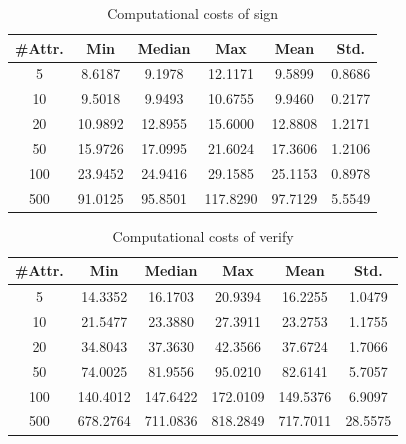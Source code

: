 \documentclass[9pt,conference]{IEEEtran}
\begin{document}
\begin{table}
\centering
\caption{Computational costs of sign}
\label{sign}
\begin{tabular}{cccccc}
\textbf{\#Attr.} & \textbf{Min} & \textbf{Median} & \textbf{Max} & \textbf{Mean} & \textbf{Std.} \\ \hline
5                & 8.6187             &9.1978                 & 12.1171             & 9.5899              &   0.8686            \\
10               & 9.5018             & 9.9493                &  10.6755            & 9.9460              & 0.2177              \\
20               & 10.9892             &12.8955                &  15.6000            &   12.8808            &    1.2171           \\
50               &15.9726              &17.0995                 &21.6024              & 17.3606              & 1.2106              \\
100              & 23.9452             &24.9416                 &29.1585              &25.1153               & 0.8978              \\
500              & 91.0125             &95.8501                 &117.8290              & 97.7129              & 5.5549             
\end{tabular}
\end{table}

\begin{table}
\centering
\caption{Computational costs of verify}
\label{verify}
\begin{tabular}{cccccc}
\textbf{\#Attr.} & \textbf{Min} & \textbf{Median} & \textbf{Max} & \textbf{Mean} & \textbf{Std.} \\ \hline
5                &14.3352              &16.1703                 & 20.9394             &  16.2255             & 1.0479              \\
10               &21.5477              & 23.3880                &27.3911              &23.2753               & 1.1755              \\
20               & 34.8043             & 37.3630                &  42.3566            &   37.6724            & 1.7066              \\
50               & 74.0025             &  81.9556               & 95.0210             & 82.6141              &  5.7057             \\
100              & 140.4012             & 147.6422             & 172.0109             &149.5376               &  6.9097             \\
500              & 678.2764             &711.0836                 & 818.2849             & 717.7011              & 28.5575             
\end{tabular}
\end{table}
\end{document}

